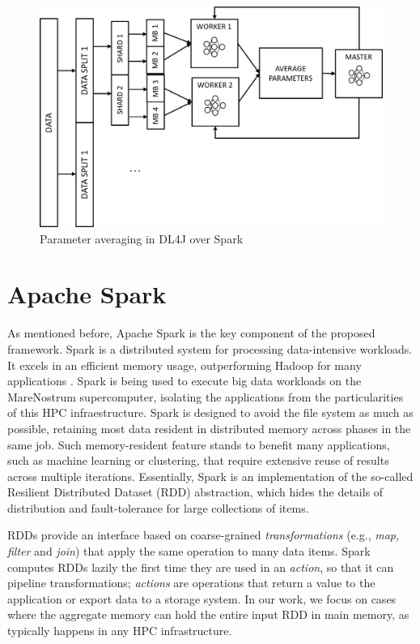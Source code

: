 \documentclass[journal]{IEEEtran}
\begin{document}
\begin{figure}
\begin{center}
\centerline{\includegraphics[width=1.0\linewidth]{img/distributed.png}}
\caption{Parameter averaging in DL4J over Spark}
\label{fig:speedup1}
\end{center}
\vspace{-0.5cm}
\end{figure}


\section{Apache Spark}
\label{sec:spark}

As mentioned before, Apache Spark is the key component of the proposed framework. Spark is a distributed system for processing data-intensive workloads. It excels in an efficient memory usage, outperforming Hadoop for many applications \cite{zaharia2012}. Spark is being used to execute big data workloads on the MareNostrum supercomputer, isolating the applications from the particularities of this HPC infraestructure. Spark is designed to avoid the file system as much as possible, retaining most data resident in distributed memory across phases in the same job. Such memory-resident feature stands to benefit many applications, such as machine learning or clustering, that require extensive reuse of results across multiple iterations.
Essentially, Spark is an implementation of the so-called Resilient Distributed Dataset (RDD) abstraction, which hides the details of distribution and fault-tolerance for large collections of items.

RDDs provide an interface based on coarse-grained {\it transformations} (e.g., \emph{map, filter} and \emph{join}) that apply the same operation to many data items. Spark computes RDDs lazily the first time they are used in an {\it action}, so that it can pipeline transformations; {\it actions} are operations that return a value to the application or export data to a storage system.
In our work, we focus on cases where the aggregate memory can hold the entire input RDD in main memory, as typically happens in any HPC infrastructure.
\end{document}

